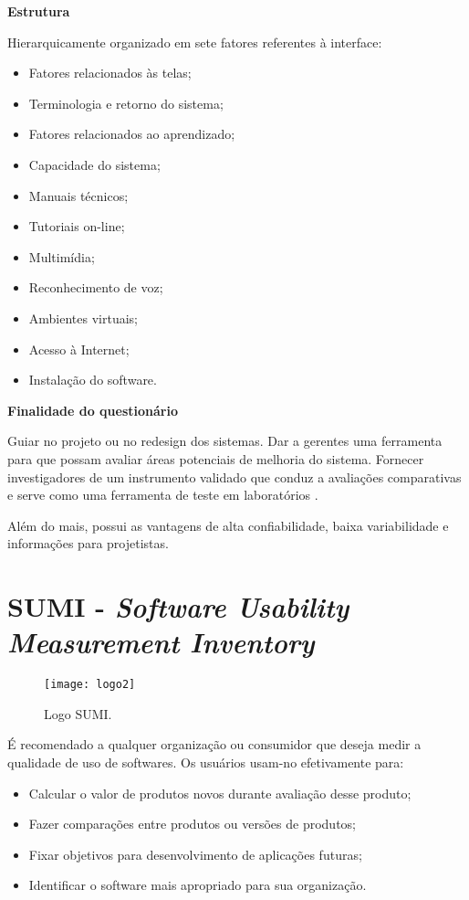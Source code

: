 		\textbf{Estrutura}

		Hierarquicamente organizado em sete fatores referentes à interface: 

		\begin{itemize}
			\item{Fatores relacionados às telas;}
			\item{Terminologia e retorno do sistema;}
			\item{Fatores relacionados ao aprendizado;}
			\item{Capacidade do sistema;}
			\item{Manuais técnicos;}
			\item{Tutoriais on-line;}
			\item{Multimídia;}
			\item{Reconhecimento de voz;}
			\item{Ambientes virtuais;}
			\item{Acesso à Internet;}
			\item{Instalação do software.}
		\end{itemize}

		\textbf{Finalidade do questionário}

		Guiar no projeto ou no redesign dos sistemas. 
		Dar a gerentes uma ferramenta para que possam avaliar áreas potenciais de melhoria do sistema. 
		Fornecer investigadores de um instrumento validado que conduz a avaliações comparativas e serve como uma ferramenta de teste em laboratórios .

		Além do mais, possui as vantagens de alta confiabilidade, baixa variabilidade e informações para projetistas. 

	\section[SUMI]{SUMI - \emph{Software Usability Measurement Inventory}}
	\label{sec:questionarios_SUMI}

		\begin{figure}[h]
			\centering
			\texttt{[image: logo2]}
			\caption[Logo SUMI]{Logo SUMI. \cite{sumi}}
			\label{fig:logo2}
		\end{figure}

		É recomendado a qualquer organização ou consumidor que deseja medir a qualidade de uso de softwares. Os usuários usam-no efetivamente para: 

		\begin{itemize}
			\item{Calcular o valor de produtos novos durante avaliação desse produto;}
			\item{Fazer comparações entre produtos ou versões de produtos;}
			\item{Fixar objetivos para desenvolvimento de aplicações futuras;}
			\item{Identificar o software mais apropriado para sua organização.}
		\end{itemize}

